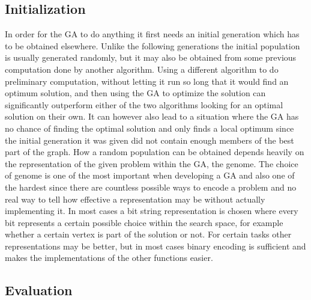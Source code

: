 \subsection{Initialization}
\label{sec:initialization}

In order for the GA to do anything it first needs an initial generation which has to be obtained elsewhere. Unlike the following generations the initial population is usually generated randomly, but it may also be obtained from some previous computation done by another algorithm. Using a different algorithm to do preliminary computation, without letting it run so long that it would find an optimum solution, and then using the GA to optimize the solution can significantly outperform either of the two algorithms looking for an optimal solution on their own. It can however also lead to a situation where the GA has no chance of finding the optimal solution and only finds a local optimum since the initial generation it was given did not contain enough members of the best part of the graph.
How a random population can be obtained depends heavily on the representation of the given problem within the GA, the genome. The choice of genome is one of the most important when developing a GA and also one of the hardest since there are countless possible ways to encode a problem and no real way to tell how effective a representation may be without actually implementing it. In most cases a bit string representation is chosen where every bit represents a certain possible choice within the search space, for example whether a certain vertex is part of the solution or not. For certain tasks other representations may be better, but in most cases binary encoding is sufficient and makes the implementations of the other functions easier.

\subsection{Evaluation}
\label{sec:evaluation}

